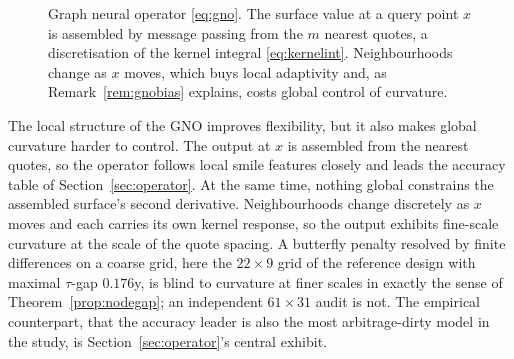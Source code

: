 \begin{figure}[htbp]\centering
{}
\caption{Graph neural operator \eqref{eq:gno}. The surface value at a query point $x$ is
assembled by message passing from the $m$ nearest quotes, a discretisation of the kernel
integral \eqref{eq:kernelint}. Neighbourhoods change as $x$ moves, which buys local adaptivity
and, as Remark~\ref{rem:gnobias} explains, costs global control of curvature.}\label{fig:gno}
\end{figure}

\begin{remark}\label{rem:gnobias}
The local structure of the GNO improves flexibility, but it also makes global curvature harder to
control. The output at $x$ is assembled from the nearest quotes, so the operator follows local
smile features closely and leads the accuracy table of Section~\ref{sec:operator}. At the same
time, nothing global constrains the assembled surface's second derivative. Neighbourhoods change
discretely as $x$ moves and each carries its own kernel response, so the output exhibits
fine-scale curvature at the scale of the quote spacing. A butterfly penalty resolved by finite
differences on a coarse grid, here the $22\times9$ grid of the reference design with maximal
$\tau$-gap $0.176$y, is blind to curvature at finer scales in exactly the sense of
Theorem~\ref{prop:nodegap}; an independent $61\times31$ audit is not. The empirical counterpart,
that the accuracy leader is also the most arbitrage-dirty model in the study, is
Section~\ref{sec:operator}'s central exhibit.
\end{remark}

